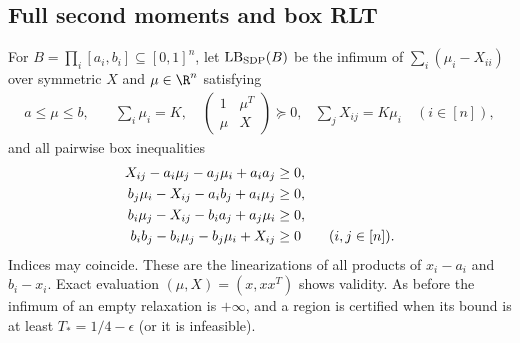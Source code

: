 \subsection{Full second moments and box RLT}
For $B=\prod_i[a_i,b_i]\subseteq[0,1]^n$, let
$\operatorname{LB}_{\rm SDP}(B)$ be the infimum of
$\sum_i(\mu_i-X_{ii})$ over symmetric $X$ and $\mu\in\R^n$ satisfying
\begin{align}
 a\le\mu\le b,\quad &\sum_i\mu_i=K,\quad
 \begin{pmatrix}1&\mu^T\\\mu&X\end{pmatrix}\succeq0,
 &\sum_jX_{ij}=K\mu_i\quad(i\in[n]),\label{eq:sdp-model}
\end{align}
and all pairwise box inequalities
\begin{align}
 X_{ij}-a_i\mu_j-a_j\mu_i+a_ia_j&\ge0,\notag\\
 b_j\mu_i-X_{ij}-a_ib_j+a_i\mu_j&\ge0,\notag\\
 b_i\mu_j-X_{ij}-b_ia_j+a_j\mu_i&\ge0,\notag\\
 b_ib_j-b_i\mu_j-b_j\mu_i+X_{ij}&\ge0
 \qquad(i,j\in[n]).\label{eq:box-rlt}
\end{align}
Indices may coincide. These are the linearizations of all products of
$x_i-a_i$ and $b_i-x_i$. Exact evaluation $(\mu,X)=(x,xx^T)$ shows
validity. As before the infimum of an empty relaxation is $+\infty$,
and a region is certified when its bound is at least
$T_*=1/4-\epsilon$ (or it is infeasible).


